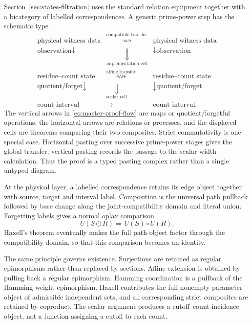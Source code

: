 Section~\ref{sec:states-filtration} uses the standard relation equipment together with a bicategory of labelled correspondences.  A generic prime-power step has the schematic type
\begin{equation}\label{eq:master-proof-flow}
\begin{array}{ccccc}
\text{physical witness data}
& \overset{\text{compatible transfer}}{\rightsquigarrow}
& \text{physical witness data}\\[1mm]
{\scriptstyle\text{observation}}\downarrow
& \underset{\text{implementation cell}}{\Downarrow}
& \downarrow{\scriptstyle\text{observation}}\\[1mm]
\text{residue--count state}
& \overset{\text{affine transfer}}{\rightsquigarrow}
& \text{residue--count state}\\[1mm]
{\scriptstyle\text{quotient/forget}}\downarrow
& \underset{\text{scalar cell}}{\Downarrow}
& \downarrow{\scriptstyle\text{quotient/forget}}\\[1mm]
\text{count interval}
& \longrightarrow
& \text{count interval}.
\end{array}
\end{equation}
The vertical arrows in \eqref{eq:master-proof-flow} are maps or quotient/forgetful operations, the horizontal arrows are relations or processes, and the displayed cells are theorems comparing their two composites.  Strict commutativity is one special case.  Horizontal pasting over successive prime-power stages gives the global transfer; vertical pasting records the passage to the scalar width calculation.  Thus the proof is a typed pasting complex rather than a single untyped diagram.

At the physical layer, a labelled correspondence retains its edge object together with source, target and interval label.  Composition is the universal path pullback followed by base change along the joint-compatibility domain and literal union.  Forgetting labels gives a normal oplax comparison
\[
U(S\odot R)\Longrightarrow U(S)\circ U(R).
\]
Haxell's theorem eventually makes the full path object factor through the compatibility domain, so that this comparison becomes an identity.

The same principle governs existence.  Surjections are retained as regular epimorphisms rather than replaced by sections.  Affine extension is obtained by pulling back a regular epimorphism.  Hamming coordination is a pullback of the Hamming-weight epimorphism.  Haxell contributes the full nonempty parameter object of admissible independent sets, and all corresponding strict composites are retained by coproduct.  The scalar argument produces a cutoff--count incidence object, not a function assigning a cutoff to each count.

